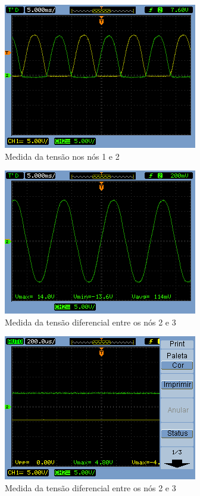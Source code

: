 \documentclass[a4paper]{article} %
\begin{document}
\newpage

\begin{figure}[h!]
\begin{centering}
\includegraphics[scale=0.7]{Imagens/3.3.1onda_completa/no12} \caption{Medida da tensão nos nós 1 e 2 \label{fig:Fig-45}}
\par\end{centering}
\end{figure}


\begin{figure}[h!]
\begin{centering}
\includegraphics[scale=0.7]{Imagens/3.3.1onda_completa/p1q3} \caption{Medida da tensão diferencial entre os nós 2 e 3 \label{fig:Fig-45}}
\par\end{centering}
\end{figure}



\newpage

\begin{figure}[h!]
\begin{centering}
\includegraphics[scale=0.7]{Imagens/3.4duplicador_tensao/423} \caption{Medida da tensão diferencial entre os nós 2 e 3 \label{fig:Fig-45}}
\par\end{centering}
\end{figure}
\end{document}
